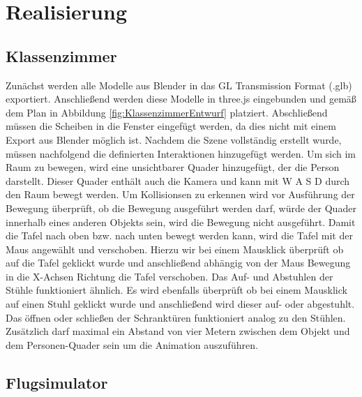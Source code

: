 \section{Realisierung}
\subsection{Klassenzimmer}
Zunächst werden alle Modelle aus Blender in das GL Transmission Format (.glb) exportiert.
Anschließend werden diese Modelle in three.js eingebunden und gemäß dem Plan in Abbildung \ref{fig:KlassenzimmerEntwurf}
platziert.
Abschließend müssen die Scheiben in die Fenster eingefügt werden, da dies nicht mit einem Export aus Blender möglich ist.
\newparagraph
Nachdem die Szene vollständig erstellt wurde, müssen nachfolgend die definierten Interaktionen hinzugefügt werden.
Um sich im Raum zu bewegen, wird eine unsichtbarer Quader hinzugefügt, der die Person darstellt. Dieser Quader enthält auch die Kamera
und kann mit W A S D durch den Raum bewegt werden. Um Kollisionsen zu erkennen wird vor Ausführung der Bewegung überprüft,
ob die Bewegung ausgeführt werden darf, würde der Quader innerhalb eines anderen Objekts sein, wird die Bewegung nicht ausgeführt.
\newparagraph
Damit die Tafel nach oben bzw. nach unten bewegt werden kann, wird die Tafel mit der Maus angewählt und verschoben.
Hierzu wir bei einem Mausklick überprüft ob auf die Tafel geklickt wurde und anschließend abhängig von der Maus Bewegung in die X-Achsen Richtung die Tafel verschoben.
Das Auf- und Abstuhlen der Stühle funktioniert ähnlich. Es wird ebenfalls überprüft ob bei einem Mausklick auf einen Stuhl geklickt wurde und anschließend wird dieser auf- oder abgestuhlt.
Das öffnen oder schließen der Schranktüren funktioniert analog zu den Stühlen.
Zusätzlich darf maximal ein Abstand von vier Metern zwischen dem Objekt und dem Personen-Quader sein um die Animation auszuführen.
\subsection{Flugsimulator}

